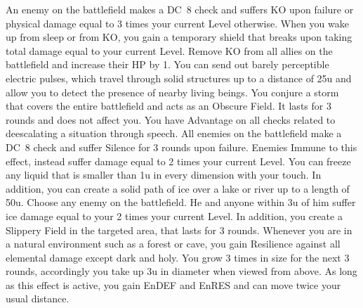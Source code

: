 {An enemy on the battlefield makes a DC~8 check and suffers KO upon failure or physical damage equal to 3 times your current Level otherwise.}
%
\vfill
%
{When you wake up from sleep or from KO, you gain a temporary shield that breaks upon taking total damage equal to your current Level.}
{Remove KO from all allies on the battlefield and increase their HP by 1.}
%
\vfill
%
{You can send out barely perceptible electric pulses, which travel through solid structures up to a distance of 25u and allow you to detect the presence of nearby living beings.}
{You conjure a storm  that covers the entire battlefield and acts as an Obscure Field. It lasts for 3 rounds and does not affect you.}
%
\vfill
%
{You have Advantage on all checks related to deescalating a situation through speech.}
{All enemies on the battlefield make a DC~8 check and suffer Silence for 3 rounds upon failure. Enemies Immune to this effect, instead suffer damage equal to 2 times your current Level.}
%
\vfill
%
{You can freeze any liquid that is smaller than 1u in every dimension with your touch. In addition, you can create a solid path of ice over a lake or river up to a length of 50u.}
{Choose any enemy on the battlefield. He and anyone within 3u of him suffer ice damage equal to your 2 times your current Level. In addition, you create a Slippery Field in the targeted area, that lasts for 3 rounds.}
%
\vfill
%
{Whenever you are in a natural environment such as a forest or cave, you gain Resilience against all elemental damage except dark and holy.}
{You grow 3 times in size for the next 3 rounds, accordingly you take up 3u in diameter when viewed from above. As long as this effect is active, you gain EnDEF and EnRES and can move twice your usual distance.}
%
\clearpage